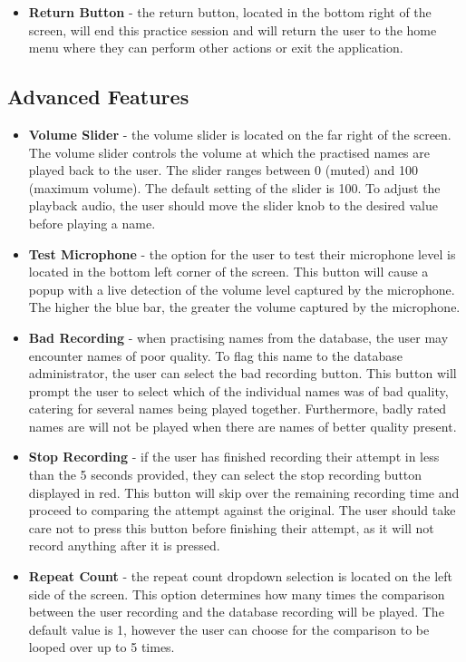 \documentclass{article}
\begin{document}
\begin{itemize}
	\item \textbf{Return Button} - the return button, located in the bottom
	right of the screen, will end this practice session and will return the user
	to the home menu where they can perform other actions or exit the
	application.

\end{itemize}

\subsection{Advanced Features}

\begin{itemize}
	\item \textbf{Volume Slider} - the volume slider is located on the far right
	of the screen. The volume slider controls the volume at which the practised
	names are played back to the user. The slider ranges between 0 (muted) and
	100 (maximum volume). The default setting of the slider is 100. To adjust
	the playback audio, the user should move the slider knob to the desired
	value before playing a name.

	\item \textbf{Test Microphone} - the option for the user to test their
	microphone level is located in the bottom left corner of the screen. This
	button will cause a popup with a live detection of the volume level captured
	by the microphone. The higher the blue bar, the greater the volume captured
	by the microphone.

	\item \textbf{Bad Recording} - when practising names from the database, the
	user may encounter names of poor quality. To flag this name to  the database
	administrator, the user can select the bad recording button. This button
	will prompt the user to select which of the  individual names was of bad
	quality, catering for several names being played together. Furthermore,
	badly rated names are will not  be played when there are names of better
	quality present.

	\item \textbf{Stop Recording} - if the user has finished recording their
	attempt in less than the 5 seconds provided, they can select the stop
	recording button displayed in red. This button will skip over the remaining
	recording time and proceed to comparing the  attempt against the original.
	The user should take care not to press this button before finishing their
	attempt, as it will not record anything after it is pressed.

	\item \textbf{Repeat Count} - the repeat count dropdown selection is located
	on the left side of the screen. This option determines  how many times the
	comparison between the user recording and the database recording will be
	played. The default value is 1,  however the user can choose for the
	comparison to be looped over up to 5 times.

\end{itemize}
\end{document}
